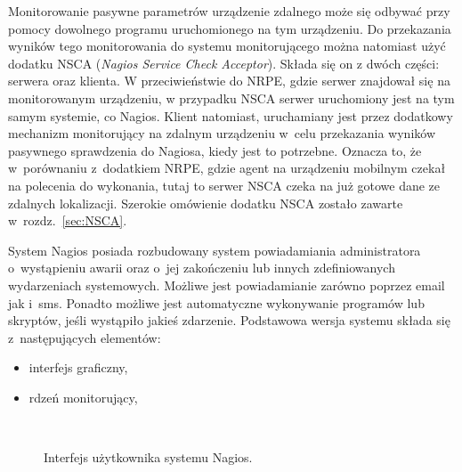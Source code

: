 Monitorowanie pasywne parametrów urządzenie zdalnego może się odbywać
przy pomocy dowolnego programu uruchomionego na tym urządzeniu. Do
przekazania wyników tego monitorowania do systemu monitorującego można
natomiast użyć dodatku NSCA ({\em Nagios Service Check
  Acceptor}). Składa się on z dwóch części: serwera oraz klienta. W
przeciwieństwie do NRPE, gdzie serwer znajdował się na monitorowanym
urządzeniu, w przypadku NSCA serwer uruchomiony jest na tym samym
systemie, co Nagios. Klient natomiast, uruchamiany jest przez
dodatkowy mechanizm monitorujący na zdalnym urządzeniu w~celu
przekazania wyników pasywnego sprawdzenia do Nagiosa, kiedy jest to
potrzebne. Oznacza to, że w~porównaniu z~dodatkiem NRPE, gdzie agent
na urządzeniu mobilnym czekał na polecenia do wykonania, tutaj to
serwer NSCA czeka na już gotowe dane ze zdalnych lokalizacji. Szerokie
omówienie dodatku NSCA zostało zawarte w~rozdz.~\ref{sec:NSCA}.

System Nagios posiada rozbudowany system powiadamiania administratora
o~wystąpieniu awarii oraz o~jej zakończeniu lub innych zdefiniowanych
wydarzeniach systemowych. Możliwe jest powiadamianie zarówno poprzez
email jak i~sms. Ponadto możliwe jest automatyczne wykonywanie
programów lub skryptów, jeśli wystąpiło jakieś zdarzenie. Podstawowa
wersja systemu składa się z~następujących elementów:

\begin{itemize}
\item interfejs graficzny,
\item rdzeń monitorujący,
\end{itemize}

\begin{figure}[h]
\label{fig:NagiosInterface}
\caption{Interfejs użytkownika systemu Nagios.}
\begin{center}
\\[0.1cm]
\end{center}
\end{figure}

